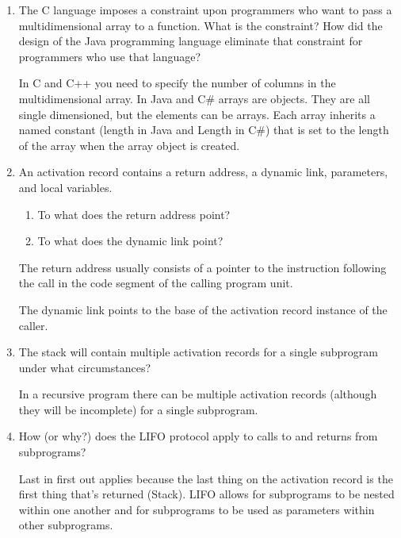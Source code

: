 \begin{enumerate}
  \item The C language imposes a constraint upon programmers
    who want to pass a multidimensional array to a function.
    What is the constraint? How did the design of the Java
    programming language eliminate that constraint for 
    programmers who use that language?

  \begin{answer}
    In C and C++ you need to specify the number of columns in the multidimensional array.  In Java and C\# arrays are objects.  They are all single dimensioned, but the elements can be arrays. Each array inherits a named constant (length in Java and Length in C\#) that is set to the length of
the array when the array object is created. 
  \end{answer}


  \item An activation record contains a return
    address, a dynamic link, parameters, and
    local variables.
  \begin{enumerate}
    \item To what does the return address point?
    \item To what does the dynamic link point?
    \end{enumerate}

  \begin{answer}

    The return address usually consists of a pointer to the instruction following the call in the code segment of the calling program unit. 

    The dynamic link points to the base of the activation record instance of the caller.

  \end{answer}

  \item The stack will contain multiple activation
    records for a single subprogram under what
    circumstances?

  \begin{answer}
    In a recursive program there can be multiple activation records (although they will be incomplete) for a single subprogram.
  \end{answer}

  \item How (or why?) does the LIFO protocol apply to
    calls to and returns from subprograms?

  \begin{answer}
    Last in first out applies because the last thing on the activation record is the first thing that's returned (Stack).  LIFO allows for subprograms to be nested within one another and for subprograms to be used as parameters within other subprograms.
  \end{answer}


\end{enumerate}
